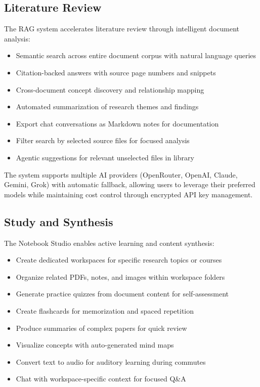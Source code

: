 \documentclass[conference]{IEEEtran}
\begin{document}

\subsection{Literature Review}

The RAG system accelerates literature review through intelligent document analysis:

\begin{itemize}
\item Semantic search across entire document corpus with natural language queries
\item Citation-backed answers with source page numbers and snippets
\item Cross-document concept discovery and relationship mapping
\item Automated summarization of research themes and findings
\item Export chat conversations as Markdown notes for documentation
\item Filter search by selected source files for focused analysis
\item Agentic suggestions for relevant unselected files in library
\end{itemize}

The system supports multiple AI providers (OpenRouter, OpenAI, Claude, Gemini, Grok) with automatic fallback, allowing users to leverage their preferred models while maintaining cost control through encrypted API key management.

\subsection{Study and Synthesis}

The Notebook Studio enables active learning and content synthesis:

\begin{itemize}
\item Create dedicated workspaces for specific research topics or courses
\item Organize related PDFs, notes, and images within workspace folders
\item Generate practice quizzes from document content for self-assessment
\item Create flashcards for memorization and spaced repetition
\item Produce summaries of complex papers for quick review
\item Visualize concepts with auto-generated mind maps
\item Convert text to audio for auditory learning during commutes
\item Chat with workspace-specific context for focused Q\&A
\end{itemize}
\end{document}
